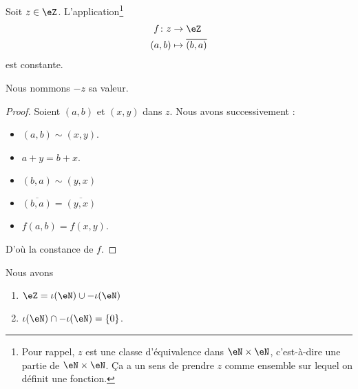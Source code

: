 \begin{lemmaDef}
	Soit \( z\in \eZ\). L'application\footnote{Pour rappel, \( z\) est une classe d'équivalence dans \( \eN\times \eN\), c'est-à-dire une partie de \( \eN\times \eN\). Ça a un sens de prendre \( z\) comme ensemble sur lequel on définit une fonction.}
	\begin{equation}
		\begin{aligned}
			f\colon z & \to \eZ                    \\
			(a,b)     & \mapsto \overline{ (b,a) }
		\end{aligned}
	\end{equation}
	est constante.

	Nous nommons \( -z\) sa valeur.
\end{lemmaDef}

\begin{proof}
	Soient \( (a,b)\) et \( (x,y)\) dans \( z\). Nous avons successivement :
	\begin{itemize}
		\item
		      \( (a,b)\sim (x,y)\).
		\item
		      \( a+y=b+x\).
		\item
		      \( (b,a)\sim (y,x)\)
		\item
		      \( \overline{ (b,a) }=\overline{ (y,x) }\)
		\item
		      \( f(a,b)=f(x,y)\).
	\end{itemize}
	D'où la constance de \( f\).
\end{proof}

\begin{lemma}
	Nous avons
	\begin{enumerate}
		\item       \label{ITEMooSQFGooQPgIMu}
		      \( \eZ=\iota(\eN)\cup -\iota(\eN)\)
		\item       \label{ITEMooHQUQooJeqULl}
		      \( \iota(\eN)\cap -\iota(\eN)=\{ 0 \}\).
	\end{enumerate}
\end{lemma}

